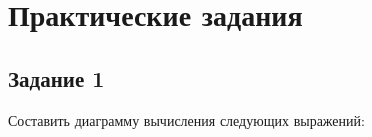 \chapter{Практические задания}

\section{Задание 1}

Составить диаграмму вычисления следующих выражений:
